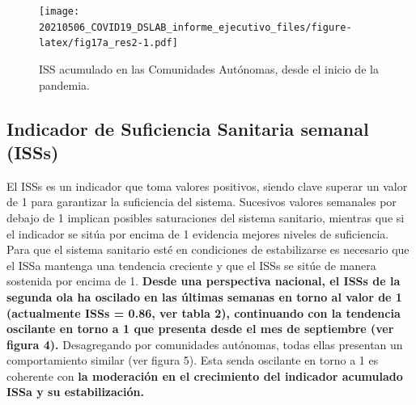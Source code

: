 \documentclass[
  11pt,
]{article}
\begin{document}
\vspace{0.2cm}

\begin{figure}
\centering
\texttt{[image: 20210506\_COVID19\_DSLAB\_informe\_ejecutivo\_files/figure-latex/fig17a\_res2-1.pdf]}
\caption{\label{fig:fig17a_res} ISS acumulado en las Comunidades
Autónomas, desde el inicio de la pandemia.}
\end{figure}

\newpage
\setcounter{page}{6}

\hypertarget{indicador-de-suficiencia-sanitaria-semanal-isss}{%
\subsection{Indicador de Suficiencia Sanitaria semanal
(ISSs)}\label{indicador-de-suficiencia-sanitaria-semanal-isss}}

El ISSs es un indicador que toma valores positivos, siendo clave superar
un valor de 1 para garantizar la suficiencia del sistema. Sucesivos
valores semanales por debajo de 1 implican posibles saturaciones del
sistema sanitario, mientras que si el indicador se sitúa por encima de 1
evidencia mejores niveles de suficiencia. Para que el sistema sanitario
esté en condiciones de estabilizarse es necesario que el ISSa mantenga
una tendencia creciente y que el ISSs se sitúe de manera sostenida por
encima de 1. \textbf{Desde una perspectiva nacional, el ISSs de la
segunda ola ha oscilado en las últimas semanas en torno al valor de 1
(actualmente ISSs = 0.86, ver tabla 2), continuando con la tendencia
oscilante en torno a 1 que presenta desde el mes de septiembre (ver
figura 4).} Desagregando por comunidades autónomas, todas ellas
presentan un comportamiento similar (ver figura 5). Esta senda oscilante
en torno a 1 es coherente con \textbf{la moderación en el crecimiento
del indicador acumulado ISSa y su estabilización. }
\end{document}
